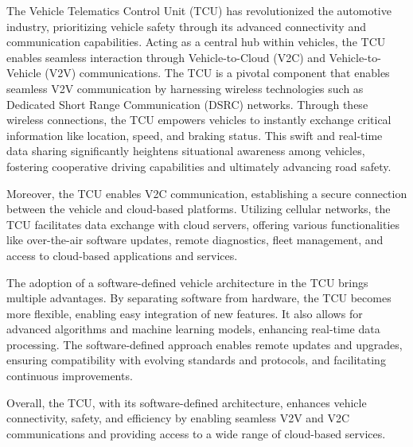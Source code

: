 \documentclass[
12pt,
oneside, 
onehalfspacing, 
nolistspacing, 
parskip, 
chapterinoneline, 
]{AASTCOMPUTER}
\begin{document}
\cleardoublepage



\begin{abstractp}
The Vehicle Telematics Control Unit (TCU) has revolutionized the automotive industry, prioritizing vehicle safety through its advanced connectivity and communication capabilities. Acting as a central hub within vehicles, the TCU enables seamless interaction through Vehicle-to-Cloud (V2C) and Vehicle-to-Vehicle (V2V) communications. The TCU is a pivotal component that enables seamless V2V communication by harnessing wireless technologies such as Dedicated Short Range Communication (DSRC) networks. Through these wireless connections, the TCU empowers vehicles to instantly exchange critical information like location, speed, and braking status. This swift and real-time data sharing significantly heightens situational awareness among vehicles, fostering cooperative driving capabilities and ultimately advancing road safety.

Moreover, the TCU enables V2C communication, establishing a secure connection between the vehicle and cloud-based platforms. Utilizing cellular networks, the TCU facilitates data exchange with cloud servers, offering various functionalities like over-the-air software updates, remote diagnostics, fleet management, and access to cloud-based applications and services.

The adoption of a software-defined vehicle architecture in the TCU brings multiple advantages. By separating software from hardware, the TCU becomes more flexible, enabling easy integration of new features. It also allows for advanced algorithms and machine learning models, enhancing real-time data processing. The software-defined approach enables remote updates and upgrades, ensuring compatibility with evolving standards and protocols, and facilitating continuous improvements.

Overall, the TCU, with its software-defined architecture, enhances vehicle connectivity, safety, and efficiency by enabling seamless V2V and V2C communications and providing access to a wide range of cloud-based services.
\end{abstractp}
\end{document}
